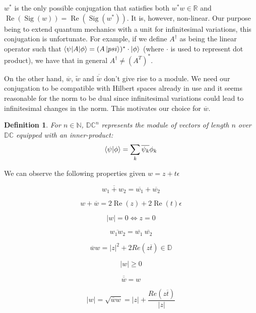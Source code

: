 \documentclass{article}
\newtheorem{definition}[theorem]{Definition}
\newcommand{\N}{\mathbb{N}}
\newcommand{\R}{\mathbb{R}}
\newcommand{\D}{\mathbb{D}}
\newcommand{\DC}{\mathbb{DC}}
\newcommand{\e}{\epsilon}
\newcommand{\til}{\widetilde}
\renewcommand{\bar}{\overline}
\renewcommand{\Re}{\operatorname{Re}}
\newcommand{\Sig}{\operatorname{Sig}}
\begin{document}
$w^*$ is the only possible conjugation that satisfies both $w^*w \in \R$ and $\Re(\Sig(w)) = \Re(\Sig(w^*))$. It is, however, non-linear. Our purpose being to extend quantum mechanics with a unit for infinitesimal variations, this conjugation is unfortunate. For example, if we define $A^\dagger$ as being the linear operator such that $\braket{\psi|A|\phi} = (A \ket{psi})^* \cdot \ket{\phi}$ (where $\cdot$ is used to represent dot product), we have that in general $A^\dagger \neq (A^T)^*$.

On the other hand, $\bar{w}$, $\til{w}$ and $\bar{\til w}$ don't give rise to a module. We need our conjugation to be compatible with Hilbert spaces already in use and it seems reasonable for the norm to be dual since infinitesimal variations could lead to infinitesimal changes in the norm. This motivates our choice for $\bar{w}$.

\begin{definition}
For $n \in \N$, $\DC^n$ represents the module of vectors of length $n$ over $\DC$ equipped with an inner-product:
\begin{equation}
 \braket{\psi|\phi} = \sum_k \bar{\psi_k}\phi_k
\end{equation}

\end{definition}

We can observe the following properties given $w = z + t\e$

\begin{multicols}{3}
\noindent \begin{equation}
\bar{w_1 + w_2} = \bar{w_1} + \bar{w_2}
\end{equation}

\noindent \begin{equation}
w + \bar{w} = 2 \Re(z) + 2 \Re(t) \e
\end{equation}

\noindent \begin{equation}
|w| = 0 \iff z = 0
\end{equation}

\columnbreak

\noindent \begin{equation}
\bar{w_1  w_2} = \bar{w_1} ~ \bar{w_2}
\end{equation}

\noindent \begin{equation}
\bar{w}w = |z|^2 + 2 Re(z\bar{t}) \in \D
\end{equation}

\noindent \begin{equation}
|w| \geq 0
\end{equation}

\columnbreak

\noindent \begin{equation}
\bar{\bar{w}} = w
\end{equation}

\noindent \begin{equation}
|w| = \sqrt{\bar{w}w} = |z| + \frac{Re(z\bar{t})}{|z|}
\end{equation}

\end{multicols}
\end{document}
